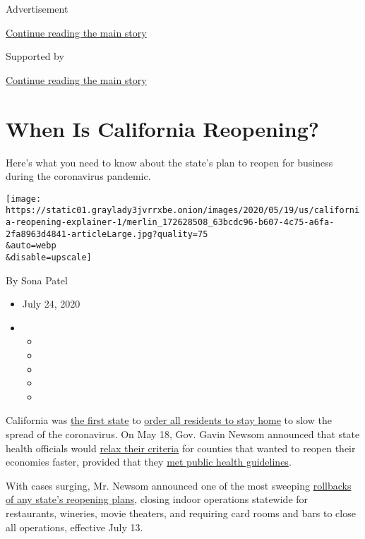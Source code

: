 Advertisement

\protect\hyperlink{after-top}{Continue reading the main story}

Supported by

\protect\hyperlink{after-sponsor}{Continue reading the main story}

\hypertarget{when-is-california-reopening}{%
\section{When Is California
Reopening?}\label{when-is-california-reopening}}

Here's what you need to know about the state's plan to reopen for
business during the coronavirus pandemic.

\texttt{[image: https://static01.graylady3jvrrxbe.onion/images/2020/05/19/us/california-reopening-explainer-1/merlin\_172628508\_63bcdc96-b607-4c75-a6fa-2fa8963d4841-articleLarge.jpg?quality=75\\\&auto=webp\\\&disable=upscale]}

By Sona Patel

\begin{itemize}
\item
  July 24, 2020
\item
  \begin{itemize}
  \item
  \item
  \item
  \item
  \item
  \end{itemize}
\end{itemize}

California was
\href{https://www.nytimes3xbfgragh.onion/interactive/2020/us/states-reopen-map-coronavirus.html?action=click\&pgtype=Article\&state=default\&module=styln-coronavirus\&variant=show\&region=TOP_BANNER\&context=storylines_menu}{the
first state} to
\href{https://www.nytimes3xbfgragh.onion/2020/03/16/us/california-newsom-bars-home-isolation.html}{order
all residents to stay home} to slow the spread of the coronavirus. On
May 18, Gov. Gavin Newsom announced that state health officials would
\href{https://www.sfchronicle.com/politics/article/Gov-Gavin-Newsom-eases-reopening-requirements-15278477.php}{relax
their criteria} for counties that wanted to reopen their economies
faster, provided that they
\href{https://www.nytimes3xbfgragh.onion/2020/05/19/us/california-reopening.html}{met
public health guidelines}.

With cases surging, Mr. Newsom announced one of the most sweeping
\href{https://twitter.com/GavinNewsom/status/1282752861835649024?s=20}{rollbacks
of any state's reopening plans}, closing indoor operations statewide for
restaurants, wineries, movie theaters, and requiring card rooms and bars
to close all operations, effective July 13.

